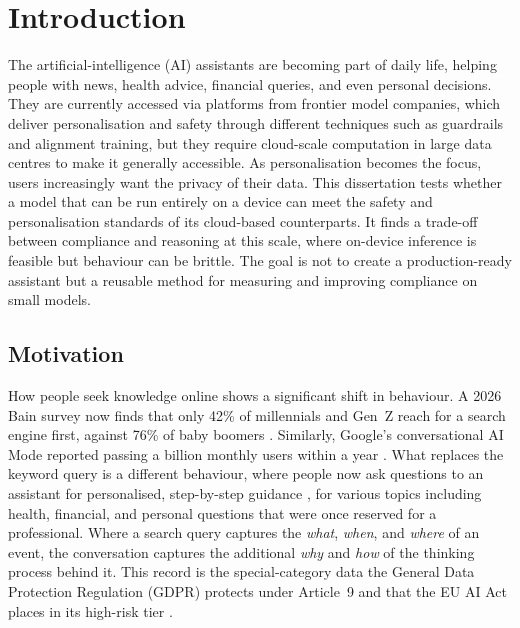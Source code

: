 \chapter{Introduction}
\label{chap:introduction}

The artificial-intelligence (AI) assistants are becoming part of daily life, helping people with news, health advice, financial queries, and even personal decisions. They are currently accessed  via platforms from frontier model companies, which deliver personalisation and safety through different techniques such as guardrails and alignment training, but they require cloud-scale computation in large data centres to make it generally accessible. As personalisation becomes the focus, users increasingly want the privacy of their data. This dissertation tests whether a model that can be run entirely on a device can meet the safety and personalisation standards of its cloud-based counterparts. It finds a trade-off between compliance and reasoning at this scale, where on-device inference is feasible but behaviour can be brittle. The goal is not to create a production-ready assistant but a reusable method for measuring and improving compliance on small models.

\section{Motivation}
\label{sec:motivation}

How people seek knowledge online shows a significant shift in behaviour. A 2026 Bain survey now finds that only 42\% of millennials and Gen~Z reach for a search engine first, against 76\% of baby boomers \cite{bain2026snapchart}. Similarly, Google's conversational AI Mode reported passing a billion monthly users within a year \cite{reid2026aisearch}. What replaces the keyword query is a different behaviour, where people now ask questions to an assistant for personalised, step-by-step guidance \cite{bain2026snapchart}, for various topics including health, financial, and personal questions that were once reserved for a professional. Where a search query captures the \emph{what}, \emph{when}, and \emph{where} of an event, the conversation captures the additional \emph{why} and \emph{how} of the thinking process behind it. This record is the special-category data the General Data Protection Regulation (GDPR) protects under Article~9 \cite{gdpr2016} and that the EU AI Act places in its high-risk tier \cite{europeanparliament2024regulationeu20241689}.

